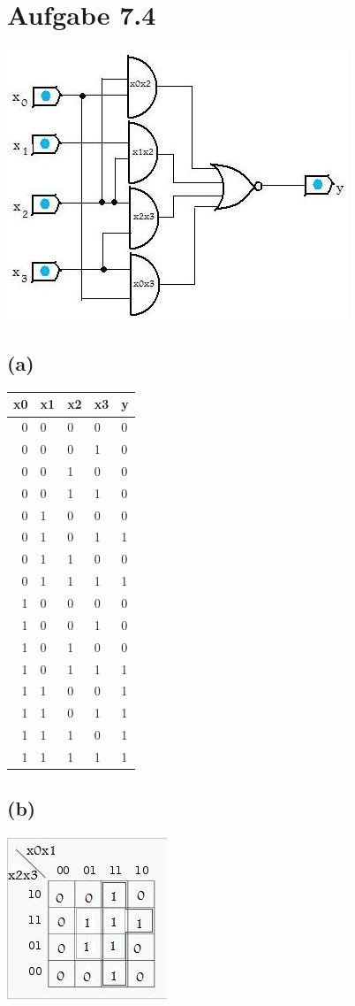 \documentclass[12pt]{article}
\begin{document}
\section{Aufgabe 7.4}
\includegraphics{Schaltnetz}
\subsection{(a)}
\begin{tabular} {rlll|l}
x0 & x1 & x2 & x3 & y \\ \hline 
0 & 0 & 0 & 0 & 0 \\
0 & 0 & 0 & 1 & 0 \\
0 & 0 & 1 & 0 & 0 \\
0 & 0 & 1 & 1 & 0 \\
0 & 1 & 0 & 0 & 0 \\
0 & 1 & 0 & 1 & 1 \\
0 & 1 & 1 & 0 & 0 \\
0 & 1 & 1 & 1 & 1 \\
1 & 0 & 0 & 0 & 0 \\
1 & 0 & 0 & 1 & 0 \\
1 & 0 & 1 & 0 & 0 \\
1 & 0 & 1 & 1 & 1 \\
1 & 1 & 0 & 0 & 1 \\
1 & 1 & 0 & 1 & 1 \\
1 & 1 & 1 & 0 & 1 \\
1 & 1 & 1 & 1 & 1
\end{tabular}

\subsection{(b)}
\includegraphics{KV-Diagramm1}
\end{document}
